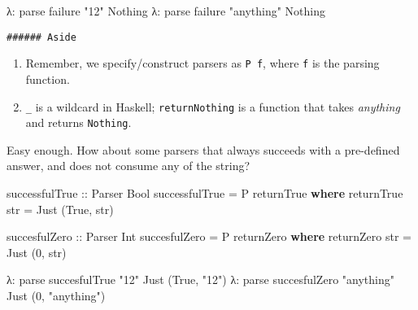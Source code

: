 \documentclass[]{article}
\newenvironment{Shaded}{}{}
\newcommand{\KeywordTok}[1]{\textcolor[rgb]{0.00,0.44,0.13}{\textbf{{#1}}}}
\newcommand{\DataTypeTok}[1]{\textcolor[rgb]{0.56,0.13,0.00}{{#1}}}
\newcommand{\DecValTok}[1]{\textcolor[rgb]{0.25,0.63,0.44}{{#1}}}
\newcommand{\StringTok}[1]{\textcolor[rgb]{0.25,0.44,0.63}{{#1}}}
\newcommand{\OtherTok}[1]{\textcolor[rgb]{0.00,0.44,0.13}{{#1}}}
\newcommand{\FunctionTok}[1]{\textcolor[rgb]{0.02,0.16,0.49}{{#1}}}
\newcommand{\NormalTok}[1]{{#1}}
\begin{document}
\begin{Shaded}
\begin{Highlighting}[]
\NormalTok{λ}\FunctionTok{:} \NormalTok{parse failure }\StringTok{"12"}
\DataTypeTok{Nothing}
\NormalTok{λ}\FunctionTok{:} \NormalTok{parse failure }\StringTok{"anything"}
\DataTypeTok{Nothing}
\end{Highlighting}
\end{Shaded}

\begin{verbatim}
###### Aside
\end{verbatim}

\begin{enumerate}
\def\labelenumi{\arabic{enumi}.}
\tightlist
\item
  Remember, we specify/construct parsers as \texttt{P\ f}, where \texttt{f} is the parsing function.
\item
  \texttt{\_} is a wildcard in Haskell; \texttt{returnNothing} is a function that takes
  \emph{anything} and returns \texttt{Nothing}.
\end{enumerate}

Easy enough. How about some parsers that always succeeds with a pre-defined answer, and does not
consume any of the string?

\begin{Shaded}
\begin{Highlighting}[]
\OtherTok{successfulTrue ::} \DataTypeTok{Parser} \DataTypeTok{Bool}
\NormalTok{successfulTrue }\FunctionTok{=} \DataTypeTok{P} \NormalTok{returnTrue}
    \KeywordTok{where}
        \NormalTok{returnTrue str }\FunctionTok{=} \DataTypeTok{Just} \NormalTok{(}\DataTypeTok{True}\NormalTok{, str)}

\OtherTok{succesfulZero ::} \DataTypeTok{Parser} \DataTypeTok{Int}
\NormalTok{succesfulZero }\FunctionTok{=} \DataTypeTok{P} \NormalTok{returnZero}
    \KeywordTok{where}
        \NormalTok{returnZero str }\FunctionTok{=} \DataTypeTok{Just} \NormalTok{(}\DecValTok{0}\NormalTok{, str)}
\end{Highlighting}
\end{Shaded}

\begin{Shaded}
\begin{Highlighting}[]
\NormalTok{λ}\FunctionTok{:} \NormalTok{parse succesfulTrue }\StringTok{"12"}
\DataTypeTok{Just} \NormalTok{(}\DataTypeTok{True}\NormalTok{, }\StringTok{"12"}\NormalTok{)}
\NormalTok{λ}\FunctionTok{:} \NormalTok{parse succesfulZero }\StringTok{"anything"}
\DataTypeTok{Just} \NormalTok{(}\DecValTok{0}\NormalTok{, }\StringTok{"anything"}\NormalTok{)}
\end{Highlighting}
\end{Shaded}
\end{document}
